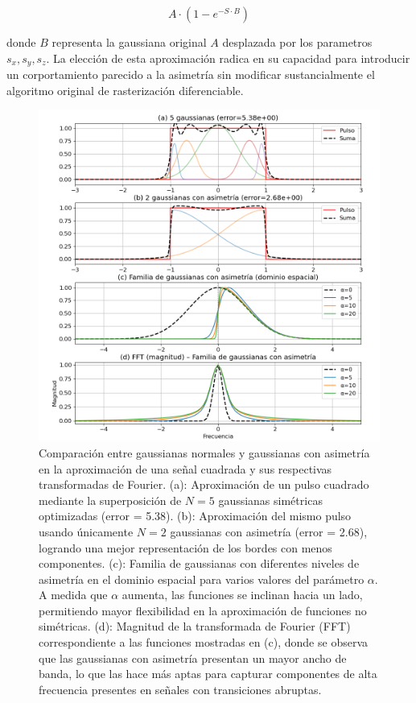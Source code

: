 \begin{equation}
    A \cdot (1-e^{-S \cdot B})
\end{equation}    

donde $B$ representa la gaussiana original $A$ desplazada por los parametros $s_x, s_y, s_z$. La elección de esta aproximación radica en su capacidad 
para introducir un corportamiento parecido a la asimetría sin modificar sustancialmente el algoritmo original de rasterización diferenciable.

\begin{figure}[htbp]
    \centering
    \includegraphics[width=1\textwidth]{Graphics/square_fft.png}
    \caption{Comparación entre gaussianas normales y gaussianas con asimetría en la aproximación de una señal cuadrada y sus respectivas transformadas de Fourier.   
    (a): Aproximación de un pulso cuadrado mediante la superposición de \(N = 5\) gaussianas simétricas optimizadas (error = 5.38). 
    (b): Aproximación del mismo pulso usando únicamente \(N = 2\) gaussianas con asimetría (error = 2.68), logrando una mejor representación de los bordes con menos componentes. 
    (c): Familia de gaussianas con diferentes niveles de asimetría en el dominio espacial para varios valores del parámetro \(\alpha\). A medida que \(\alpha\) aumenta, las funciones se inclinan hacia un lado, permitiendo mayor flexibilidad en la aproximación de funciones no simétricas. 
    (d): Magnitud de la transformada de Fourier (FFT) correspondiente a las funciones mostradas en (c), donde se observa que las gaussianas con asimetría presentan un mayor ancho de banda, lo que las hace más aptas para capturar componentes de alta frecuencia presentes en señales con transiciones abruptas.}
    \label{fig:square}
\end{figure}


